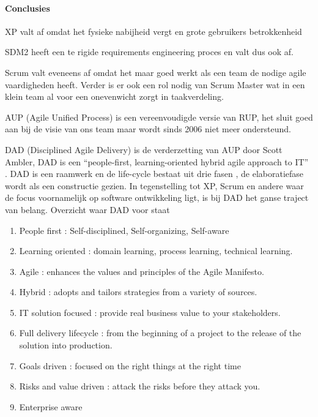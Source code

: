 \paragraph{Conclusies}
\begin{description}
\item XP valt af omdat het fysieke nabijheid vergt en grote gebruikers betrokkenheid
\item SDM2 heeft een te rigide requirements engineering proces en valt dus ook af.
\item Scrum valt eveneens af omdat het maar goed werkt als een team de nodige agile vaardigheden heeft.
	Verder is er ook een rol nodig van Scrum Master wat in een klein team al
	voor een onevenwicht zorgt in taakverdeling.
\item AUP (Agile Unified Process) is een vereenvoudigde versie van RUP, het sluit goed aan
	bij de visie van ons team maar wordt sinds 2006 niet meer ondersteund.
\item DAD (Disciplined Agile Delivery) is de verderzetting van AUP door Scott Ambler, DAD
    is een ``people-first, learning-oriented hybrid agile approach to IT'' . DAD is een raamwerk en
    de life-cycle bestaat uit drie fasen , de elaboratiefase wordt als een constructie gezien.
    In tegenstelling tot XP, Scrum en andere waar de focus voornamelijk op software ontwikkeling
    ligt, is bij DAD het ganse traject van belang.
Overzicht waar DAD voor staat
	\begin{enumerate}
		\item People first : Self-disciplined, Self-organizing, Self-aware
		\item Learning oriented : domain learning, process learning, technical learning.
		\item Agile : enhances the values and principles of the Agile Manifesto.
		\item Hybrid : adopts and tailors strategies from a variety of sources.
		\item IT solution focused :  provide real business value to your stakeholders.
		\item Full delivery lifecycle : from the beginning of a project to the release of the solution into production.
		\item Goals driven : focused on the right things at the right time
		\item Risks and value driven : attack the risks before they attack you.
		\item Enterprise aware
	\end{enumerate}


\end{description}
